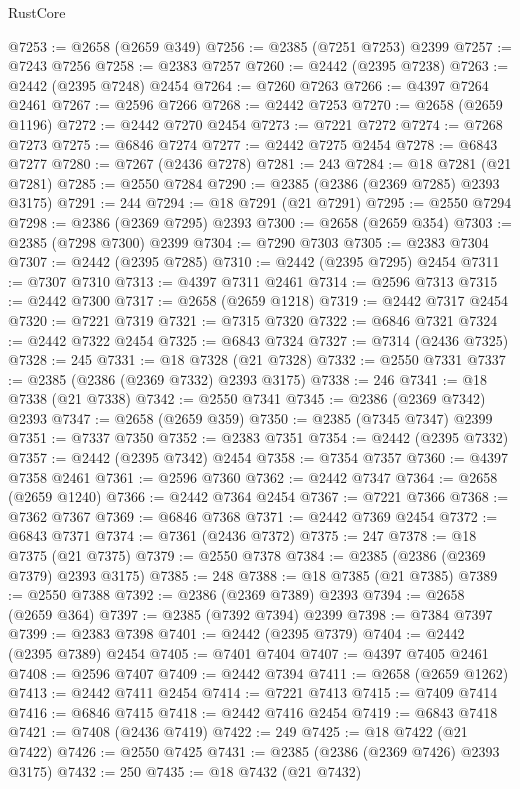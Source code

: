 \begin{lexlean}{RustCore}
\begin{coremodule}
@7253 := @2658 (@2659 @349)
@7256 := @2385 (@7251 @7253) @2399
@7257 := @7243 @7256
@7258 := @2383 @7257
@7260 := @2442 (@2395 @7238)
@7263 := @2442 (@2395 @7248) @2454
@7264 := @7260 @7263
@7266 := @4397 @7264 @2461
@7267 := @2596 @7266
@7268 := @2442 @7253
@7270 := @2658 (@2659 @1196)
@7272 := @2442 @7270 @2454
@7273 := @7221 @7272
@7274 := @7268 @7273
@7275 := @6846 @7274
@7277 := @2442 @7275 @2454
@7278 := @6843 @7277
@7280 := @7267 (@2436 @7278)
@7281 := 243
@7284 := @18 @7281 (@21 @7281)
@7285 := @2550 @7284
@7290 := @2385 (@2386 (@2369 @7285) @2393 @3175)
@7291 := 244
@7294 := @18 @7291 (@21 @7291)
@7295 := @2550 @7294
@7298 := @2386 (@2369 @7295) @2393
@7300 := @2658 (@2659 @354)
@7303 := @2385 (@7298 @7300) @2399
@7304 := @7290 @7303
@7305 := @2383 @7304
@7307 := @2442 (@2395 @7285)
@7310 := @2442 (@2395 @7295) @2454
@7311 := @7307 @7310
@7313 := @4397 @7311 @2461
@7314 := @2596 @7313
@7315 := @2442 @7300
@7317 := @2658 (@2659 @1218)
@7319 := @2442 @7317 @2454
@7320 := @7221 @7319
@7321 := @7315 @7320
@7322 := @6846 @7321
@7324 := @2442 @7322 @2454
@7325 := @6843 @7324
@7327 := @7314 (@2436 @7325)
@7328 := 245
@7331 := @18 @7328 (@21 @7328)
@7332 := @2550 @7331
@7337 := @2385 (@2386 (@2369 @7332) @2393 @3175)
@7338 := 246
@7341 := @18 @7338 (@21 @7338)
@7342 := @2550 @7341
@7345 := @2386 (@2369 @7342) @2393
@7347 := @2658 (@2659 @359)
@7350 := @2385 (@7345 @7347) @2399
@7351 := @7337 @7350
@7352 := @2383 @7351
@7354 := @2442 (@2395 @7332)
@7357 := @2442 (@2395 @7342) @2454
@7358 := @7354 @7357
@7360 := @4397 @7358 @2461
@7361 := @2596 @7360
@7362 := @2442 @7347
@7364 := @2658 (@2659 @1240)
@7366 := @2442 @7364 @2454
@7367 := @7221 @7366
@7368 := @7362 @7367
@7369 := @6846 @7368
@7371 := @2442 @7369 @2454
@7372 := @6843 @7371
@7374 := @7361 (@2436 @7372)
@7375 := 247
@7378 := @18 @7375 (@21 @7375)
@7379 := @2550 @7378
@7384 := @2385 (@2386 (@2369 @7379) @2393 @3175)
@7385 := 248
@7388 := @18 @7385 (@21 @7385)
@7389 := @2550 @7388
@7392 := @2386 (@2369 @7389) @2393
@7394 := @2658 (@2659 @364)
@7397 := @2385 (@7392 @7394) @2399
@7398 := @7384 @7397
@7399 := @2383 @7398
@7401 := @2442 (@2395 @7379)
@7404 := @2442 (@2395 @7389) @2454
@7405 := @7401 @7404
@7407 := @4397 @7405 @2461
@7408 := @2596 @7407
@7409 := @2442 @7394
@7411 := @2658 (@2659 @1262)
@7413 := @2442 @7411 @2454
@7414 := @7221 @7413
@7415 := @7409 @7414
@7416 := @6846 @7415
@7418 := @2442 @7416 @2454
@7419 := @6843 @7418
@7421 := @7408 (@2436 @7419)
@7422 := 249
@7425 := @18 @7422 (@21 @7422)
@7426 := @2550 @7425
@7431 := @2385 (@2386 (@2369 @7426) @2393 @3175)
@7432 := 250
@7435 := @18 @7432 (@21 @7432)

\end{coremodule}
\end{lexlean}
